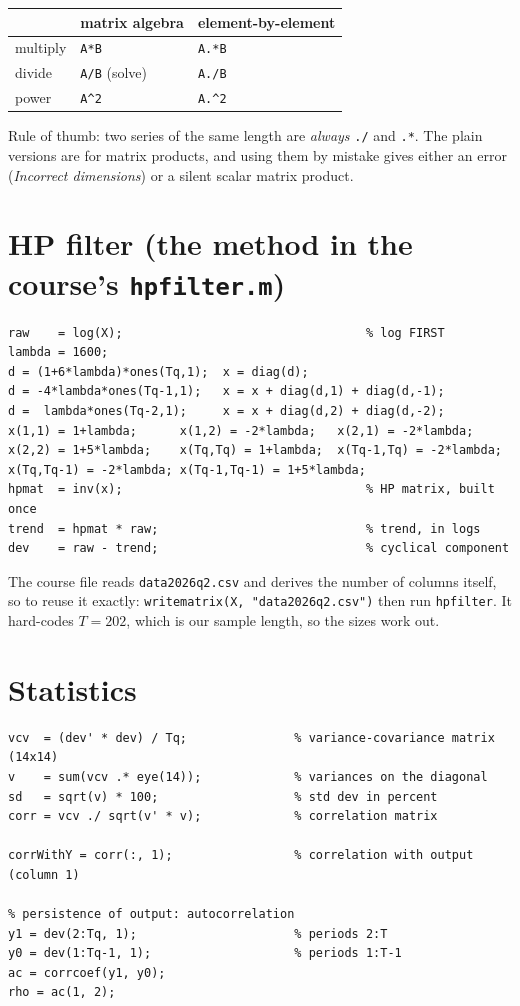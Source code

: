 \documentclass[11pt]{article}
\begin{document}
\begin{center}
\begin{tabular}{@{}lll@{}}
\toprule
 & matrix algebra & element-by-element \\
\midrule
multiply & \texttt{A*B} & \texttt{A.*B} \\
divide   & \texttt{A/B} (solve) & \texttt{A./B} \\
power    & \texttt{A\^{}2} & \texttt{A.\^{}2} \\
\bottomrule
\end{tabular}
\end{center}

Rule of thumb: two series of the same length are \emph{always} \lstinline[style=inl]!./! and
\lstinline[style=inl]!.*!. The plain versions are for matrix products, and using them by mistake
gives either an error (\emph{Incorrect dimensions}) or a silent scalar matrix
product.

\section{HP filter (the method in the course's \texttt{hpfilter.m})}

\begin{lstlisting}
raw    = log(X);                                  % log FIRST
lambda = 1600;
d = (1+6*lambda)*ones(Tq,1);  x = diag(d);
d = -4*lambda*ones(Tq-1,1);   x = x + diag(d,1) + diag(d,-1);
d =  lambda*ones(Tq-2,1);     x = x + diag(d,2) + diag(d,-2);
x(1,1) = 1+lambda;      x(1,2) = -2*lambda;   x(2,1) = -2*lambda;
x(2,2) = 1+5*lambda;    x(Tq,Tq) = 1+lambda;  x(Tq-1,Tq) = -2*lambda;
x(Tq,Tq-1) = -2*lambda; x(Tq-1,Tq-1) = 1+5*lambda;
hpmat  = inv(x);                                  % HP matrix, built once
trend  = hpmat * raw;                             % trend, in logs
dev    = raw - trend;                             % cyclical component
\end{lstlisting}

The course file reads \lstinline[style=inl]!data2026q2.csv! and derives the number of columns
itself, so to reuse it exactly:
\lstinline[style=inl]!writematrix(X, "data2026q2.csv")! then run \lstinline[style=inl]!hpfilter!. It hard-codes
$T=202$, which is our sample length, so the sizes work out.

\section{Statistics}

\begin{lstlisting}
vcv  = (dev' * dev) / Tq;               % variance-covariance matrix (14x14)
v    = sum(vcv .* eye(14));             % variances on the diagonal
sd   = sqrt(v) * 100;                   % std dev in percent
corr = vcv ./ sqrt(v' * v);             % correlation matrix

corrWithY = corr(:, 1);                 % correlation with output (column 1)

% persistence of output: autocorrelation
y1 = dev(2:Tq, 1);                      % periods 2:T
y0 = dev(1:Tq-1, 1);                    % periods 1:T-1
ac = corrcoef(y1, y0);
rho = ac(1, 2);
\end{lstlisting}
\end{document}
